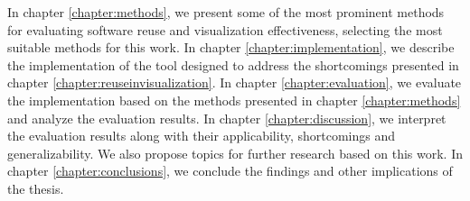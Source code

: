 In chapter \ref{chapter:methods}, we present some of the most prominent methods for evaluating software reuse and visualization effectiveness, selecting the most suitable methods for this work. In chapter \ref{chapter:implementation}, we describe the implementation of the tool designed to address the shortcomings presented in chapter \ref{chapter:reuseinvisualization}. In chapter \ref{chapter:evaluation}, we evaluate the implementation based on the methods presented in chapter \ref{chapter:methods} and analyze the evaluation results. In chapter \ref{chapter:discussion}, we interpret the evaluation results along with their applicability, shortcomings and generalizability. We also propose topics for further research based on this work. In chapter \ref{chapter:conclusions}, we conclude the findings and other implications of the thesis.